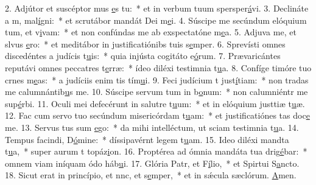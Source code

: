 2. Adjútor et suscéptor mus \uline{e}s tu:~* et in verbum tuum spersper\uline{á}vi.
3. Declináte a m, mal\uline{í}gni:~* et scrutábor mandát Dei m\uline{e}i.
4. Súscipe me secúndum elóquium tum, et v\uline{i}vam:~* et non confúndas me ab exspectatóne m\uline{e}a.
5. Adjuva me, et slvus \uline{e}ro:~* et meditábor in justificatiónibs tuis s\uline{e}mper.
6. Sprevísti omnes discedéntes a judícis t\uline{u}is:~* quia injústa cogitáto e\uline{ó}rum.
7. Prævaricántes reputávi omnes peccatres t\uline{e}rræ:~* ídeo diléxi testimnia t\uline{u}a.
8. Confíge timóre tuo crnes m\uline{e}as:~* a judíciis enim tis tím\uline{u}i.
9. Feci judícium t just\uline{í}tiam:~* non tradas me calumnántib\uline{u}s me.
10. Súscipe servum tum in b\uline{o}num:~* non calumniéntr me sup\uline{é}rbi.
11. Oculi mei defecérunt in salutre t\uline{u}um:~* et in elóquium justtiæ t\uline{u}æ.
12. Fac cum servo tuo secúndum misericórdam t\uline{u}am:~* et justificatiónes tas doc\uline{e} me.
13. Servus tus sum \uline{e}go:~* da mihi intelléctum, ut sciam testimnia t\uline{u}a.
14. Tempus facindi, D\uline{ó}mine:~* díssipavérnt legem t\uline{u}am.
15. Ideo diléxi mandta t\uline{u}a,~* super aurum t topáz\uline{i}on.
16. Proptérea ad ómnia mandáta tua drig\uline{é}bar:~* omnem viam iníquam ódo háb\uline{u}i.
17. Glória Patr, et F\uline{í}lio,~* et Spirtui S\uline{a}ncto.
18. Sicut erat in princípio, et nnc, et s\uline{e}mper,~* et in sǽcula sæclórum. \uline{A}men.
